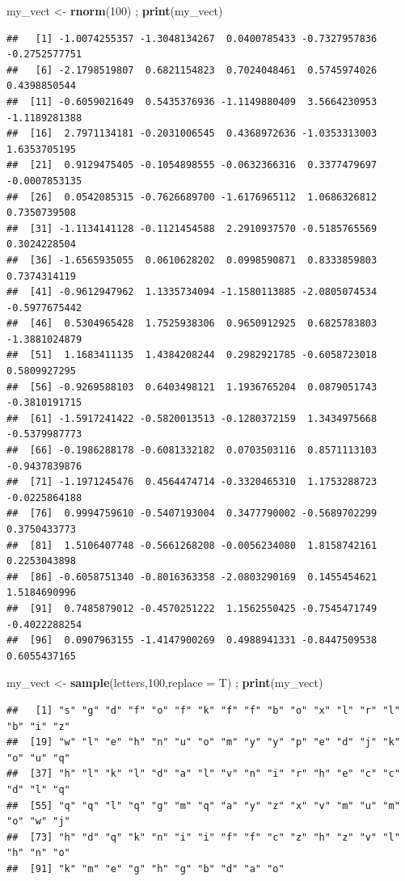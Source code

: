 \documentclass[
]{book}
\newenvironment{Shaded}{\begin{snugshade}}{\end{snugshade}}
\newcommand{\DataTypeTok}[1]{\textcolor[rgb]{0.13,0.29,0.53}{#1}}
\newcommand{\DecValTok}[1]{\textcolor[rgb]{0.00,0.00,0.81}{#1}}
\newcommand{\KeywordTok}[1]{\textcolor[rgb]{0.13,0.29,0.53}{\textbf{#1}}}
\newcommand{\NormalTok}[1]{#1}
\newcommand{\StringTok}[1]{\textcolor[rgb]{0.31,0.60,0.02}{#1}}
\begin{document}
\begin{Shaded}
\begin{Highlighting}[]
\NormalTok{my_vect <-}\StringTok{ }\KeywordTok{rnorm}\NormalTok{(}\DecValTok{100}\NormalTok{) ; }\KeywordTok{print}\NormalTok{(my_vect)}
\end{Highlighting}
\end{Shaded}

\begin{verbatim}
##   [1] -1.0074255357 -1.3048134267  0.0400785433 -0.7327957836 -0.2752577751
##   [6] -2.1798519807  0.6821154823  0.7024048461  0.5745974026  0.4398850544
##  [11] -0.6059021649  0.5435376936 -1.1149880409  3.5664230953 -1.1189281388
##  [16]  2.7971134181 -0.2031006545  0.4368972636 -1.0353313003  1.6353705195
##  [21]  0.9129475405 -0.1054898555 -0.0632366316  0.3377479697 -0.0007853135
##  [26]  0.0542085315 -0.7626689700 -1.6176965112  1.0686326812  0.7350739508
##  [31] -1.1134141128 -0.1121454588  2.2910937570 -0.5185765569  0.3024228504
##  [36] -1.6565935055  0.0610628202  0.0998590871  0.8333859803  0.7374314119
##  [41] -0.9612947962  1.1335734094 -1.1580113885 -2.0805074534 -0.5977675442
##  [46]  0.5304965428  1.7525938306  0.9650912925  0.6825783803 -1.3881024879
##  [51]  1.1683411135  1.4384208244  0.2982921785 -0.6058723018  0.5809927295
##  [56] -0.9269588103  0.6403498121  1.1936765204  0.0879051743 -0.3810191715
##  [61] -1.5917241422 -0.5820013513 -0.1280372159  1.3434975668 -0.5379987773
##  [66] -0.1986288178 -0.6081332182  0.0703503116  0.8571113103 -0.9437839876
##  [71] -1.1971245476  0.4564474714 -0.3320465310  1.1753288723 -0.0225864188
##  [76]  0.9994759610 -0.5407193004  0.3477790002 -0.5689702299  0.3750433773
##  [81]  1.5106407748 -0.5661268208 -0.0056234080  1.8158742161  0.2253043898
##  [86] -0.6058751340 -0.8016363358 -2.0803290169  0.1455454621  1.5184690996
##  [91]  0.7485879012 -0.4570251222  1.1562550425 -0.7545471749 -0.4022288254
##  [96]  0.0907963155 -1.4147900269  0.4988941331 -0.8447509538  0.6055437165
\end{verbatim}

\begin{Shaded}
\begin{Highlighting}[]
\NormalTok{my_vect <-}\StringTok{ }\KeywordTok{sample}\NormalTok{(letters,}\DecValTok{100}\NormalTok{,}\DataTypeTok{replace =}\NormalTok{ T) ; }\KeywordTok{print}\NormalTok{(my_vect)}
\end{Highlighting}
\end{Shaded}

\begin{verbatim}
##   [1] "s" "g" "d" "f" "o" "f" "k" "f" "f" "b" "o" "x" "l" "r" "l" "b" "i" "z"
##  [19] "w" "l" "e" "h" "n" "u" "o" "m" "y" "y" "p" "e" "d" "j" "k" "o" "u" "q"
##  [37] "h" "l" "k" "l" "d" "a" "l" "v" "n" "i" "r" "h" "e" "c" "c" "d" "l" "q"
##  [55] "q" "q" "l" "q" "g" "m" "q" "a" "y" "z" "x" "v" "m" "u" "m" "o" "w" "j"
##  [73] "h" "d" "q" "k" "n" "i" "i" "f" "f" "c" "z" "h" "z" "v" "l" "h" "n" "o"
##  [91] "k" "m" "e" "g" "h" "g" "b" "d" "a" "o"
\end{verbatim}
\end{document}
